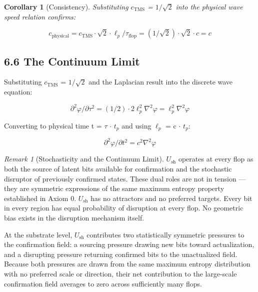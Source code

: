 \documentclass[11pt,oneside]{report}
\newtheorem{corollary}[theorem]{Corollary}
\theoremstyle{definition}
\theoremstyle{remark}
\newtheorem{remark}[theorem]{Remark}
\begin{document}
\begin{corollary}[Consistency]
Substituting \ensuremath{c_{\mathrm{TMS}}} = \ensuremath{1/\sqrt{2}} into the physical wave
speed relation confirms:
\end{corollary}

\begin{equation*}
c_{\mathrm{physical}} = c_{\mathrm{TMS}} \cdot \sqrt{2} \cdot \ell_{p} / \tau_{\mathrm{flop}} = (1/\sqrt{2}) \cdot \sqrt{2} \cdot c = c
\end{equation*}

\subsection*{6.6 The Continuum Limit}

Substituting \ensuremath{c_{\mathrm{TMS}}} = \ensuremath{1/\sqrt{2}} and the Laplacian result into the discrete wave
equation:

\begin{equation*}
\partial ^{2}\varphi / \partial \tau^{2} = (1/2) \cdot 2\ell^{2}_{p} \nabla ^{2}\varphi = \ell^{2}_{p} \nabla ^{2}\varphi
\end{equation*}

Converting to physical time t = \ensuremath{\tau} \ensuremath{\cdot} \ensuremath{t_{p}} and using \ensuremath{\ell_{p}} = c \ensuremath{\cdot} \ensuremath{t_{p}:}

\begin{equation*}
\partial ^{2}\varphi / \partial t^{2} = c^{2} \nabla ^{2}\varphi
\end{equation*}

\begin{remark}[Stochasticity and the Continuum Limit]
\ensuremath{U_{\mathrm{sh}}} operates at every
flop as both the source of latent bits available for confirmation and
the stochastic disruptor of previously confirmed states. These dual
roles are not in tension --- they are symmetric expressions of the same
maximum entropy property established in Axiom 0. \ensuremath{U_{\mathrm{sh}}} has no attractors
and no preferred targets. Every bit in every region has equal
probability of disruption at every flop. No geometric bias exists in the
disruption mechanism itself.
\end{remark}

At the substrate level, \ensuremath{U_{\mathrm{sh}}} contributes two statistically symmetric
pressures to the confirmation field: a sourcing pressure drawing new
bits toward actualization, and a disrupting pressure returning confirmed
bits to the unactualized field. Because both pressures are drawn from
the same maximum entropy distribution with no preferred scale or
direction, their net contribution to the large-scale confirmation field
averages to zero across sufficiently many flops.
\end{document}
